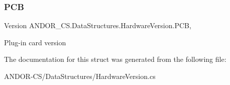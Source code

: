 \subsubsection{\texorpdfstring{P\+CB}{PCB}}
{\footnotesize\ttfamily Version A\+N\+D\+O\+R\+\_\+\+C\+S.\+Data\+Structures.\+Hardware\+Version.\+P\+CB\hspace{0.3cm}{\ttfamily [get]}, {\ttfamily [set]}}



Plug-\/in card version 



The documentation for this struct was generated from the following file\+:\begin{DoxyCompactItemize}
\item 
A\+N\+D\+O\+R-\/\+C\+S/\+Data\+Structures/Hardware\+Version.\+cs\end{DoxyCompactItemize}
